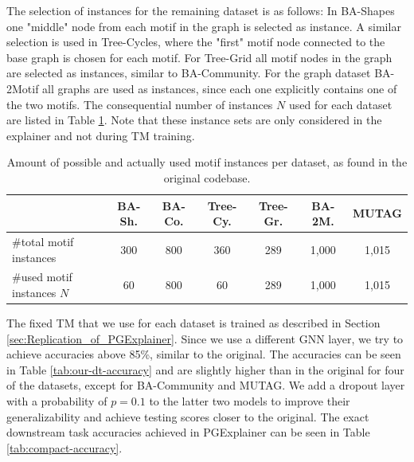 The selection of instances for the remaining dataset is as follows: In BA-Shapes one "middle" node from each motif in the graph is selected as instance. A similar selection is used in Tree-Cycles, where the "first" motif node connected to the base graph is chosen for each motif. For Tree-Grid all motif nodes in the graph are selected as instances, similar to BA-Community. For the graph dataset BA-2Motif all graphs are used as instances, since each one explicitly contains one of the two motifs. The consequential number of instances $N$ used for each dataset are listed in Table \ref{tab:motif-statistics}. Note that these instance sets are only considered in the explainer and not during \ac{TM} training.

\begin{table}[h]
    \centering
    \scriptsize
    \begin{tabular}{l|cccc|cc}
    \hline
    \textbf{} & \textbf{BA-Sh.} & \textbf{BA-Co.} & \textbf{Tree-Cy.} & \textbf{Tree-Gr.} & \textbf{BA-2M.} & \textbf{MUTAG} \\
    \hline
    \#total motif instances & 300 & 800 & 360 & 289 & 1,000 & 1,015 \\
    \#used motif instances $N$ & 60 & 800 & 60 & 289 & 1,000 & 1,015 \\
    \hline
    \end{tabular}
    \caption[Statistics of motif instances per dataset]{Amount of possible and actually used motif instances per dataset, as found in the original codebase.}
    \label{tab:motif-statistics}
\end{table}



The fixed \ac{TM} that we use for each dataset is trained as described in Section \ref{sec:Replication_of_PGExplainer}. Since we use a different GNN layer, we try to achieve accuracies above 85\%, similar to the original. The accuracies can be seen in Table \ref{tab:our-dt-accuracy} and are slightly higher than in the original for four of the datasets, except for BA-Community and MUTAG. We add a dropout layer with a probability of $p=0.1$ to the latter two models to improve their generalizability and achieve testing scores closer to the original. The exact downstream task accuracies achieved in PGExplainer \cite{luo2020parameterized} can be seen in Table \ref{tab:compact-accuracy}. \bigskip

